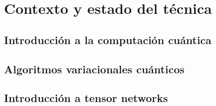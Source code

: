 \chapter{Contexto y estado del técnica}
\section{Introducción a la computación cuántica}
\section{Algoritmos variacionales cuánticos}
\section{Introducción a tensor networks}
